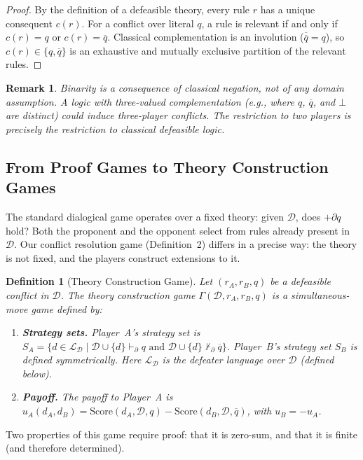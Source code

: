 \documentclass[11pt]{article}
\newtheorem{definition}{Definition}
\newtheorem{remark}{Remark}
\newcommand{\D}{\mathcal{D}}
\newcommand{\Score}{\mathrm{Score}}
\newcommand{\comp}[1]{\overline{#1}}
\begin{document}
\begin{proof}
By the definition of a defeasible theory, every rule $r$ has a unique consequent $c(r)$. For a conflict over literal $q$, a rule is relevant if and only if $c(r) = q$ or $c(r) = \comp{q}$. Classical complementation is an involution ($\comp{\comp{q}} = q$), so $c(r) \in \{q, \comp{q}\}$ is an exhaustive and mutually exclusive partition of the relevant rules.
\end{proof}
 
\begin{remark}
Binarity is a consequence of classical negation, not of any domain assumption. A logic with three-valued complementation (e.g., where $q$, $\comp{q}$, and $\bot$ are distinct) could induce three-player conflicts. The restriction to two players is precisely the restriction to classical defeasible logic.
\end{remark}
 
\subsection{From Proof Games to Theory Construction Games}
 
The standard dialogical game operates over a fixed theory: given $\D$, does $+\partial q$ hold? Both the proponent and the opponent select from rules already present in $\D$. Our conflict resolution game (Definition~2) differs in a precise way: the theory is not fixed, and the players construct extensions to it.
 
\begin{definition}[Theory Construction Game]
Let $(r_A, r_B, q)$ be a defeasible conflict in $\D$. The theory construction game $\Gamma(\D, r_A, r_B, q)$ is a simultaneous-move game defined by:
\begin{enumerate}[nosep]
    \item \textbf{Strategy sets.} Player~A's strategy set is $S_A = \{d \in \mathcal{L}_\D \mid \D \cup \{d\} \vdash_\partial q \text{ and } \D \cup \{d\} \not\vdash_\partial \comp{q}\}$. Player~B's strategy set $S_B$ is defined symmetrically. Here $\mathcal{L}_\D$ is the defeater language over $\D$ (defined below).
    \item \textbf{Payoff.} The payoff to Player~A is $u_A(d_A, d_B) = \Score(d_A, \D, q) - \Score(d_B, \D, \comp{q})$, with $u_B = -u_A$.
\end{enumerate}
\end{definition}
 
Two properties of this game require proof: that it is zero-sum, and that it is finite (and therefore determined).
 
\end{document}
